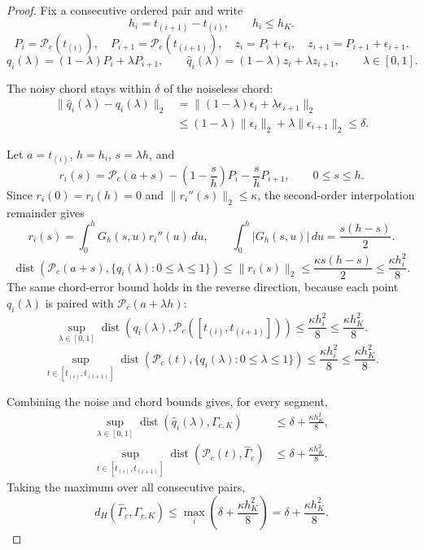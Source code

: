 \documentclass{article}
\begin{document}
\begin{proof}
	Fix a consecutive ordered pair and write
	\[
	h_i=t_{(i+1)}-t_{(i)},\qquad h_i\le h_K.
	\]
	\[
	P_i=\mathcal{P}_c(t_{(i)}),\quad
	P_{i+1}=\mathcal{P}_c(t_{(i+1)}),\quad
	z_i=P_i+\epsilon_i,\quad
	z_{i+1}=P_{i+1}+\epsilon_{i+1}.
	\]
	\[
	q_i(\lambda)=(1-\lambda)P_i+\lambda P_{i+1},
	\qquad
	\hat q_i(\lambda)=(1-\lambda)z_i+\lambda z_{i+1},
	\qquad
	\lambda\in[0,1].
	\]

	The noisy chord stays within $\delta$ of the noiseless chord:
	\[
	\begin{aligned}
	\lVert \hat q_i(\lambda)-q_i(\lambda)\rVert_2
	&=
	\lVert(1-\lambda)\epsilon_i+\lambda\epsilon_{i+1}\rVert_2\\
	&\le
	(1-\lambda)\lVert\epsilon_i\rVert_2+\lambda\lVert\epsilon_{i+1}\rVert_2
	\le
	\delta .
	\end{aligned}
	\]

	Let $a=t_{(i)}$, $h=h_i$, $s=\lambda h$, and
	\[
	r_i(s)=\mathcal{P}_c(a+s)-\left(1-\frac{s}{h}\right)P_i-\frac{s}{h}P_{i+1},
	\qquad 0\le s\le h .
	\]
	Since $r_i(0)=r_i(h)=0$ and $\lVert r_i''(s)\rVert_2\le\kappa$, the second-order interpolation remainder gives
	\[
	r_i(s)=
	\int_0^hG_h(s,u)r_i''(u)\,du,
	\qquad
	\int_0^h|G_h(s,u)|\,du=\frac{s(h-s)}{2}.
	\]
	\[
	\operatorname{dist}\!\left(\mathcal{P}_c(a+s),\{q_i(\lambda):0\le\lambda\le1\}\right)
	\le
	\lVert r_i(s)\rVert_2
	\le
	\frac{\kappa s(h-s)}{2}
	\le
	\frac{\kappa h_i^2}{8}.
	\]
	The same chord-error bound holds in the reverse direction, because each point $q_i(\lambda)$ is paired with $\mathcal{P}_c(a+\lambda h)$:
	\[
	\sup_{\lambda\in[0,1]}
	\operatorname{dist}\!\left(q_i(\lambda),\mathcal{P}_c([t_{(i)},t_{(i+1)}])\right)
	\le
	\frac{\kappa h_i^2}{8}
	\le
	\frac{\kappa h_K^2}{8}.
	\]
	\[
	\sup_{t\in[t_{(i)},t_{(i+1)}]}
	\operatorname{dist}\!\left(\mathcal{P}_c(t),\{q_i(\lambda):0\le\lambda\le1\}\right)
	\le
	\frac{\kappa h_i^2}{8}
	\le
	\frac{\kappa h_K^2}{8}.
	\]

	Combining the noise and chord bounds gives, for every segment,
	\[
	\begin{aligned}
	\sup_{\lambda\in[0,1]}
	\operatorname{dist}(\hat q_i(\lambda),\Gamma_{c,K})
	&\le
	\delta+\frac{\kappa h_K^2}{8},\\
	\sup_{t\in[t_{(i)},t_{(i+1)}]}
	\operatorname{dist}(\mathcal{P}_c(t),\widehat{\Gamma}_c)
	&\le
	\delta+\frac{\kappa h_K^2}{8}.
	\end{aligned}
	\]
	Taking the maximum over all consecutive pairs,
	\[
	d_H(\widehat{\Gamma}_c,\Gamma_{c,K})
	\le
	\max_i\left(\delta+\frac{\kappa h_K^2}{8}\right)
	=
	\delta+\frac{\kappa h_K^2}{8}.
	\]
\end{proof}
\end{document}
